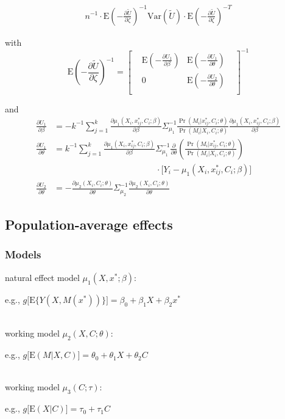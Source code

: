 \documentclass[]{article}
\begin{document}
\begin{eqnarray*}
\displaystyle n^{-1}\cdot\mbox{E}\left(-\frac{\partial \tilde U}{\partial \zeta}\right)^{-1} \mbox{Var}(\tilde U) \cdot \mbox{E}\left(-\frac{\partial \tilde U}{\partial \zeta}\right)^{-T}
\end{eqnarray*}

\noindent with 
\[
\renewcommand\arraystretch{2.5}
\displaystyle \mbox{E}\left(-\frac{\partial \tilde U}{\partial \zeta}\right)^{-1} = 
\begin{bmatrix}
& \displaystyle\mbox{E}\left(-\frac{\partial U_1}{\partial \beta}\right) & \displaystyle\mbox{E}\left(-\frac{\partial U_1}{\partial \theta}\right) &\\
& 0 & \displaystyle\mbox{E}\left(-\frac{\partial U_2}{\partial \theta}\right) &\\
\end{bmatrix}^{-1}
\]

\noindent and
\begin{align*}
\displaystyle \frac{\partial U_1}{\partial \beta} &= - k^{-1} \sum_{j=1}^{k} \frac{\partial \mu_1(X_i,x^*_{ij},C_i;\beta)}{\partial \beta} \Sigma_{\mu_1}^{-1} \frac{\Pr(M_i\vert x^*_{ij},C_i;\theta)}{\Pr(M_i\vert X_i,C_i;\theta)} \frac{\partial \mu_1(X_i,x^*_{ij},C_i;\beta)}{\partial \beta}\\[0.6em]
\displaystyle \frac{\partial U_1}{\partial \theta} &= k^{-1} \sum_{j=1}^{k} \frac{\partial \mu_1(X_i,x^*_{ij},C_i;\beta)}{\partial \beta} \Sigma_{\mu_1}^{-1} \frac{\partial}{\partial \theta}\left(\frac{\Pr(M_i\vert x^*_{ij},C_i;\theta)}{\Pr(M_i\vert X_i,C_i;\theta)}\right)\\[-0.6em] & \qquad \qquad \qquad \qquad \qquad \qquad \cdot \big[ Y_i - \mu_1(X_i,x^*_{ij},C_i;\beta) \big]\\[0.6em]
\displaystyle \frac{\partial U_2}{\partial \theta} &= - \frac{\partial \mu_2(X_i,C_i;\theta)}{\partial \theta} \Sigma_{\mu_2}^{-1} \frac{\partial \mu_2(X_i,C_i;\theta)}{\partial \theta}
\end{align*}

\subsection*{Population-average effects}

\subsubsection*{Models}

natural effect model $\mu_1(X,x^*;\beta)$:
\begin{flushright} e.g., $g\big[\textrm{E}\{Y(X,M(x^*))\}\big] = \beta_0 + \beta_1 X + \beta_2 x^*$\end{flushright}\\[1em]
working model $\mu_2(X,C;\theta)$:
\begin{flushright} e.g., $g\big[\textrm{E}(M\vert X,C)\big] = \theta_0 + \theta_1 X + \theta_2 C$\end{flushright}\\[1em]
working model $\mu_3(C;\tau)$:
\begin{flushright} e.g., $g\big[\textrm{E}(X\vert C)\big] = \tau_0 + \tau_1 C$ \end{flushright}
\end{document}
